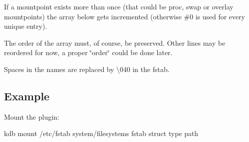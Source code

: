 If a mountpoint exists more than once (that could be proc, swap or overlay mountpoints) the array below gets incremented (otherwise \#0 is used for every unique entry).

The order of the array must, of course, be preserved. Other lines may be reordered for now, a proper \char`\"{}order\char`\"{} could be done later.

Spaces in the names are replaced by \textbackslash{}040 in the fstab.

\subsection*{Example}

Mount the plugin\+: \begin{DoxyVerb}kdb mount /etc/fstab system/filesystems fstab struct type path\end{DoxyVerb}
 
